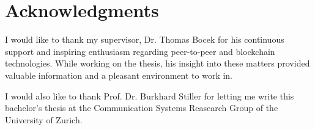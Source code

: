 \chapter*{Acknowledgments}

I would like to thank my supervisor, Dr. Thomas Bocek for his continuous support and inspiring enthusiasm regarding peer-to-peer  and blockchain technologies. While working on the thesis, his insight into these matters provided valuable information and a pleasant environment to work in.

I would also like to thank Prof. Dr. Burkhard Stiller for letting me write this bachelor's thesis at the Communication Systems Reasearch Group of the University of Zurich.